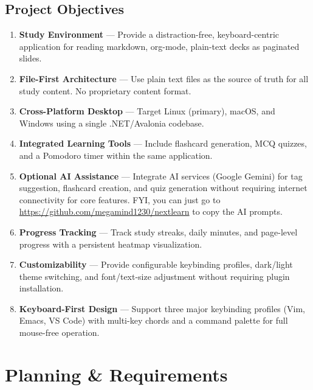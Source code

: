 \documentclass[14pt]{article}
\begin{document}
\subsection{Project Objectives}
\label{sec:orgaeb2534}
\begin{enumerate}
\item \textbf{\textbf{Study Environment}} — Provide a distraction-free, keyboard-centric
application for reading markdown, org-mode, plain-text decks as paginated
slides.

\item \textbf{\textbf{File-First Architecture}} — Use plain text files as the source of
truth for all study content. No proprietary content format.

\item \textbf{\textbf{Cross-Platform Desktop}} — Target Linux (primary), macOS, and
Windows using a single .NET/Avalonia codebase.

\item \textbf{\textbf{Integrated Learning Tools}} — Include flashcard generation, MCQ
quizzes, and a Pomodoro timer within the same application.

\item \textbf{\textbf{Optional AI Assistance}} — Integrate AI services (Google Gemini)
for tag suggestion, flashcard creation, and quiz generation without
requiring internet connectivity for core features.
FYI, you can just go to \url{https://github.com/megamind1230/nextlearn}
to copy the AI prompts.

\item \textbf{\textbf{Progress Tracking}} — Track study streaks, daily minutes, and
page-level progress with a persistent heatmap visualization.

\item \textbf{\textbf{Customizability}} — Provide configurable keybinding profiles,
dark/light theme switching, and font/text-size adjustment without
requiring plugin installation.

\item \textbf{\textbf{Keyboard-First Design}} — Support three major keybinding profiles
(Vim, Emacs, VS Code) with multi-key chords and a command palette
for full mouse-free operation.
\end{enumerate}

\newpage
\section{Planning \& Requirements}
\label{sec:org71b8ff2}
\end{document}
